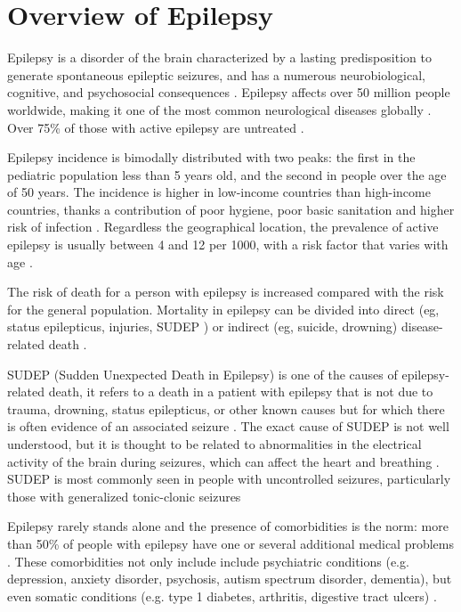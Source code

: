 \section{Overview of Epilepsy}
Epilepsy is a disorder of the brain characterized by a lasting predisposition to generate spontaneous epileptic seizures, and has a numerous neurobiological, cognitive, and psychosocial consequences \cite{defEpilepsy}.
Epilepsy affects over 50 million people worldwide, making it one of the most common neurological diseases globally \cite{WHO}. Over 75\% of those with active epilepsy are untreated \cite{defeating_epilepsy}.

Epilepsy incidence is bimodally distributed with two peaks: the first in the pediatric population less than 5 years old, and the second in people over the age of 50 years. The incidence is higher in low-income countries than high-income countries, thanks a contribution of poor hygiene, poor basic sanitation and higher risk of infection \cite{THIJS2019689}.
Regardless the geographical location, the prevalence of active epilepsy is usually between 4 and 12 per 1000, with a risk factor that varies with age \cite{Fiest296}.

The risk of death for a person with epilepsy is increased compared with the risk for the general population. Mortality in epilepsy can be divided into direct (eg, status epilepticus, injuries, SUDEP \cite{Langan211}) or indirect (eg, suicide, drowning) disease-related death \cite{Devinsky779}. 

\noindent SUDEP (Sudden Unexpected Death in Epilepsy) is one of the causes of epilepsy-related death, it refers to a death in a patient with epilepsy that is not due to trauma, drowning, status epilepticus, or other known causes but for which there is often evidence of an associated seizure \cite{Nashef1997}. The exact cause of SUDEP is not well understood, but it is thought to be related to abnormalities in the electrical activity of the brain during seizures, which can affect the heart and breathing \cite{Devinsky2011}. SUDEP is most commonly seen in people with uncontrolled seizures, particularly those with generalized tonic-clonic seizures \cite{Devinsky2011}

Epilepsy rarely stands alone and the presence of comorbidities is the norm: more than 50\% of people with epilepsy have one or several additional medical problems \cite{THIJS2019689}. These comorbidities not only include include psychiatric conditions (e.g. depression, anxiety disorder, psychosis, autism spectrum disorder, dementia), but even somatic conditions (e.g. type 1 diabetes, arthritis, digestive tract ulcers) \cite{yuen2018epilepsy}.

